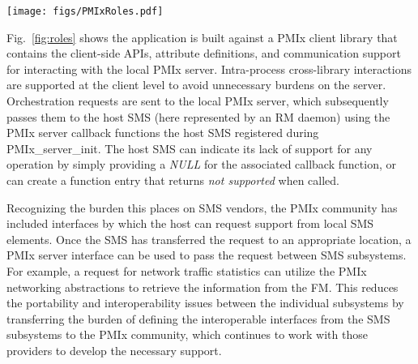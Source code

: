 \begingroup
\begin{figure*}[ht!]
  \begin{center}
    \texttt{[image: figs/PMIxRoles.pdf]}
  \end{center}
  \caption{PMIx-SMS Interactions}
  \label{fig:roles}
\end{figure*}
\endgroup


 Fig.~\ref{fig:roles} shows  the application is built against a \ac{PMIx} client library that contains the client-side \acp{API},
attribute definitions, and communication support for interacting with the local \ac{PMIx} server. Intra-process cross-library interactions
are supported at the client level to avoid unnecessary burdens on the server. Orchestration requests are sent to the
local \ac{PMIx} server, which subsequently passes them to the host \ac{SMS} (here represented by an \ac{RM} daemon) using the \ac{PMIx} server callback functions the host \ac{SMS} registered during PMIx\_server\_init. The host \ac{SMS} can indicate its lack of support for any operation by simply providing a \textit{NULL} for the associated callback function, or can create a function entry that returns \textit{not supported} when called.



%
%
Recognizing the burden this places on SMS vendors, the PMIx community has included interfaces by
which the host can request support from local SMS elements. Once the SMS has transferred the request to
an appropriate location, a PMIx server interface can be used to pass the request between SMS subsystems.
For example, a request for network traffic statistics can utilize the
PMIx networking abstractions to retrieve the information from the FM. This reduces the portability and
interoperability issues between the individual subsystems by transferring the burden of defining the
interoperable interfaces from the SMS subsystems to the PMIx community, which continues
to work with those providers to develop the necessary support.

